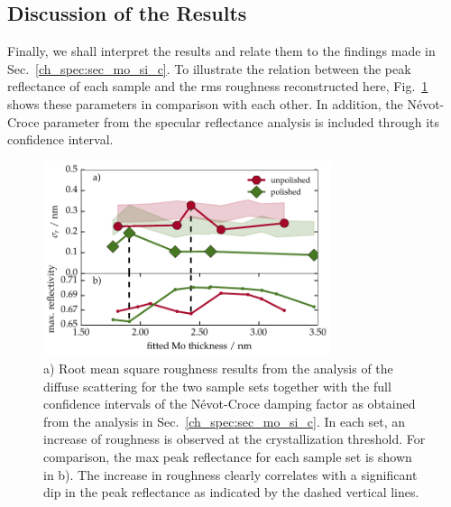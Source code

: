 \subsection{Discussion of the Results}
Finally, we shall interpret the results and relate them to the findings made in Sec.~\ref{ch_spec:sec_mo_si_c}. To illustrate the relation between the peak reflectance of each sample and the \gls{rms} roughness reconstructed here, Fig.~\ref{ch_diff:fig_Mo_Si_C_PSD_results} shows these parameters in comparison with each other. In addition, the N\'{e}vot-Croce parameter from the specular reflectance analysis is included through its confidence interval.
\begin{figure}[htbp]
\centering
\includegraphics[width=0.75\textwidth]{img/MoSiC_PSD_results}
\caption{a) Root mean square roughness results from the analysis of the diffuse scattering for the two sample sets together with the full confidence intervals of the N\'{e}vot-Croce damping factor as obtained from the analysis in Sec.~\ref{ch_spec:sec_mo_si_c}. In each set, an increase of roughness is observed at the crystallization threshold. For comparison, the max peak reflectance for each sample set is shown in b). The increase in roughness clearly correlates with a significant dip in the peak reflectance as indicated by the dashed vertical lines.}
\label{ch_diff:fig_Mo_Si_C_PSD_results}
\end{figure}

